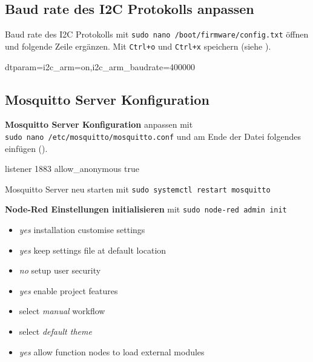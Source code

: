 \documentclass[
  11pt,
  a4paperpaper,
  oneside, openany  ,captions=tableheading
]{scrbook}
\newenvironment{Shaded}{\begin{snugshade}}{\end{snugshade}}
\newcommand{\ExtensionTok}[1]{\textcolor[rgb]{0.00,0.23,0.31}{#1}}
\newcommand{\NormalTok}[1]{\textcolor[rgb]{0.00,0.23,0.31}{#1}}
\newcommand{\OperatorTok}[1]{\textcolor[rgb]{0.37,0.37,0.37}{#1}}
\newcommand{\VariableTok}[1]{\textcolor[rgb]{0.07,0.07,0.07}{#1}}
\providecommand{\tightlist}{%
  \setlength{\itemsep}{0pt}\setlength{\parskip}{0pt}}
\theoremstyle{definition}
\theoremstyle{remark}
\begin{document}
\subsection{Baud rate des I2C Protokolls
anpassen}\label{baud-rate-des-i2c-protokolls-anpassen}

Baud rate des I2C Protokolls mit
\texttt{sudo\ nano\ /boot/firmware/config.txt} öffnen und folgende Zeile
ergänzen. Mit \texttt{Ctrl+o} und \texttt{Ctrl+x} speichern (siehe
).

\begin{Shaded}
\begin{Highlighting}[]
\VariableTok{dtparam}\OperatorTok{=}\NormalTok{i2c\_arm=on,i2c\_arm\_baudrate=400000}
\end{Highlighting}
\end{Shaded}

\subsection{Mosquitto Server
Konfiguration}\label{mosquitto-server-konfiguration}

\textbf{Mosquitto Server Konfiguration} anpassen mit
\texttt{sudo\ nano\ /etc/mosquitto/mosquitto.conf} und am Ende der Datei
folgendes einfügen ().

\begin{Shaded}
\begin{Highlighting}[]
\ExtensionTok{listener}\NormalTok{ 1883}
\ExtensionTok{allow\_anonymous}\NormalTok{ true}
\end{Highlighting}
\end{Shaded}

Mosquitto Server neu starten mit
\texttt{sudo\ systemctl\ restart\ mosquitto}

\textbf{Node-Red Einstellungen initialisieren} mit
\texttt{sudo\ node-red\ admin\ init}

\begin{itemize}
\tightlist
\item
  \emph{yes} installation customise settings
\item
  \emph{yes} keep settings file at default location
\item
  \emph{no} setup user security
\item
  \emph{yes} enable project features
\item
  select \emph{manual} workflow
\item
  select \emph{default theme}
\item
  \emph{yes} allow function nodes to load external modules
\end{itemize}
\end{document}
